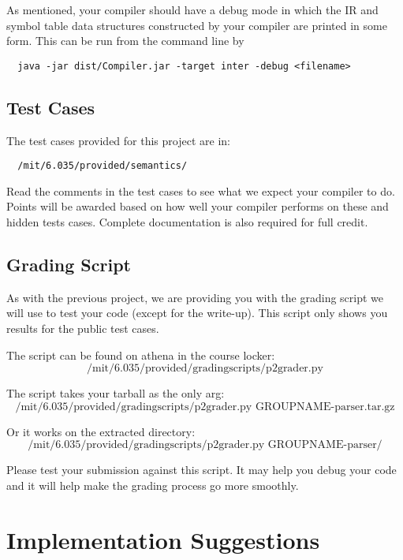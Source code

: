 As mentioned, your compiler should have a debug mode in which the IR
and symbol table data structures constructed by your compiler are
printed in some form.  This can be run from the command line by
\begin{verbatim}
  java -jar dist/Compiler.jar -target inter -debug <filename>
\end{verbatim}

\subsection*{Test Cases}

The test cases provided for this project are in:
\begin{verbatim}
  /mit/6.035/provided/semantics/
\end{verbatim}

Read the comments in the test cases to see what we expect your
compiler to do.  Points will be awarded based on how well your
compiler performs on these and hidden tests cases.  Complete
documentation is also required for full credit.

\subsection*{Grading Script}

As with the previous project, we are providing you with the grading script
we will use to test your code (except for the write-up).  This script only
shows you results for the public test cases.

The script can be found on athena in the course locker: 
\[
\mbox{/mit/6.035/provided/gradingscripts/p2grader.py}
\]

The script takes your tarball as the only arg:
\[
\mbox{/mit/6.035/provided/gradingscripts/p2grader.py GROUPNAME-parser.tar.gz}
\]

Or it works on the extracted directory:
\[
\mbox{/mit/6.035/provided/gradingscripts/p2grader.py GROUPNAME-parser/}
\]

Please test your submission against this script.  It may help you debug your
code and it will help make the grading process go more smoothly.



\section*{Implementation Suggestions}


